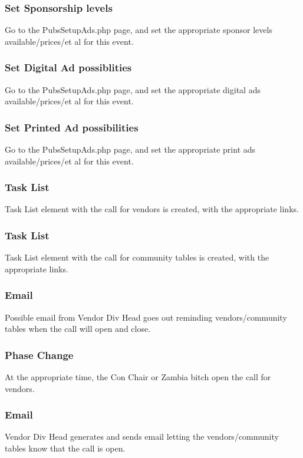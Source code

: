 \documentclass[captions=tablesignature]{scrartcl}
\begin{document}
\subsubsection{Set Sponsorship levels}
\label{sec-3-2-3}
Go to the PubsSetupAds.php page, and set the
appropriate sponsor levels available/prices/et al for this event.

\subsubsection{Set Digital Ad possiblities}
\label{sec-3-2-4}
Go to the PubsSetupAds.php page, and set the
appropriate digital ads available/prices/et al for this event.

\subsubsection{Set Printed Ad possibilities}
\label{sec-3-2-5}
Go to the PubsSetupAds.php page, and set the
appropriate print ads available/prices/et al for this event.

\subsubsection{Task List}
\label{sec-3-2-6}
Task List element with the call for vendors is created, with the
appropriate links.

\subsubsection{Task List}
\label{sec-3-2-7}
Task List element with the call for community tables is created,
with the appropriate links.

\subsubsection{Email}
\label{sec-3-2-8}
Possible email from Vendor Div Head goes out reminding
vendors/community tables when the call will open and close.

\subsubsection{Phase Change}
\label{sec-3-2-9}
At the appropriate time, the Con Chair or Zambia bitch open the
call for vendors.

\subsubsection{Email}
\label{sec-3-2-10}
Vendor Div Head generates and sends email letting the
vendors/community tables know that the call is open.
\end{document}
